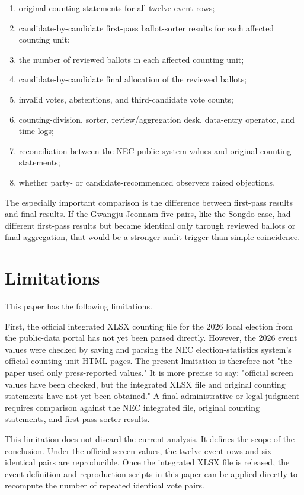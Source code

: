 \documentclass[preprint]{IEIE}
\begin{document}
\begin{enumerate}
\item original counting statements for all twelve event rows;
\item candidate-by-candidate first-pass ballot-sorter results for each affected counting unit;
\item the number of reviewed ballots in each affected counting unit;
\item candidate-by-candidate final allocation of the reviewed ballots;
\item invalid votes, abstentions, and third-candidate vote counts;
\item counting-division, sorter, review/aggregation desk, data-entry operator, and time logs;
\item reconciliation between the NEC public-system values and original counting statements;
\item whether party- or candidate-recommended observers raised objections.
\end{enumerate}

The especially important comparison is the difference between first-pass results and final results. If the Gwangju-Jeonnam five pairs, like the Songdo case, had different first-pass results but became identical only through reviewed ballots or final aggregation, that would be a stronger audit trigger than simple coincidence.

\section{Limitations}

This paper has the following limitations.

First, the official integrated XLSX counting file for the 2026 local election from the public-data portal has not yet been parsed directly. However, the 2026 event values were checked by saving and parsing the NEC election-statistics system's official counting-unit HTML pages. The present limitation is therefore not "the paper used only press-reported values." It is more precise to say: "official screen values have been checked, but the integrated XLSX file and original counting statements have not yet been obtained." A final administrative or legal judgment requires comparison against the NEC integrated file, original counting statements, and first-pass sorter results.

This limitation does not discard the current analysis. It defines the scope of the conclusion. Under the official screen values, the twelve event rows and six identical pairs are reproducible. Once the integrated XLSX file is released, the event definition and reproduction scripts in this paper can be applied directly to recompute the number of repeated identical vote pairs.
\end{document}
